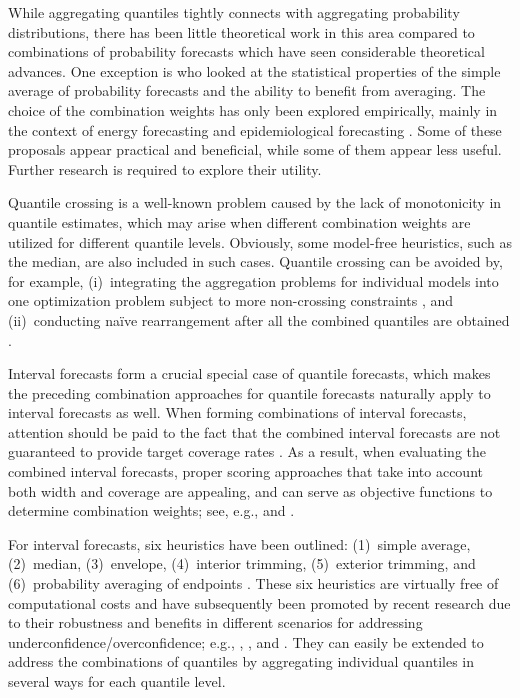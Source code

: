\documentclass[11pt]{article}
\begin{document}
While aggregating quantiles tightly connects with aggregating probability distributions, there has been little theoretical work in this area compared to combinations of probability forecasts which have seen considerable theoretical advances. One exception is \citet{Lichtendahl2013-rt} who looked at the statistical properties of the simple average of probability forecasts and the ability to benefit from averaging. The choice of the combination weights has only been explored empirically, mainly in the context of energy forecasting \citep[e.g.,][]{Wang2019-lx,Browell2020-pa} and epidemiological forecasting \citep[e.g.,][]{Brooks2020-sg,Ray2020-qg}. Some of these proposals appear practical and beneficial, while some of them appear less useful. Further research is required to explore their utility.

Quantile crossing is a well-known problem caused by the lack of monotonicity in quantile estimates, which may arise when different combination weights are utilized for different quantile levels. Obviously, some model-free heuristics, such as the median, are also included in such cases. Quantile crossing can be avoided by, for example, (i)~integrating the aggregation problems for individual models into one optimization problem subject to more non-crossing constraints \citep[e.g.,][]{Kim2021-wa}, and (ii)~conducting na\"{i}ve rearrangement after all the combined quantiles are obtained \citep[e.g.,][]{Chernozhukov2010-zz}.

Interval forecasts form a crucial special case of quantile forecasts, which makes the preceding combination approaches for quantile forecasts naturally apply to interval forecasts as well. When forming combinations of interval forecasts, attention should be paid to the fact that the combined interval forecasts are not guaranteed to provide target coverage rates \citep{Wallis2005-yf,Timmermann2006-en,Grushka-Cockayne2020-qv}. As a result, when evaluating the combined interval forecasts, proper scoring approaches that take into account both width and coverage are appealing, and can serve as objective functions to determine combination weights; see, e.g., \citet{Gneiting2007-ij} and \citet{Jose2009-lh}.

For interval forecasts, six heuristics have been outlined: (1)~simple average, (2)~median, (3)~envelope, (4)~interior trimming, (5)~exterior trimming, and (6)~probability averaging of endpoints \citep{Park2015-zn,Gaba2017-om}. These six heuristics are virtually free of computational costs and have subsequently been promoted by recent research due to their robustness and benefits in different scenarios for addressing underconfidence/overconfidence; e.g., \citet{Smyl2019-av}, \citet{Petropoulos2020-fp}, and \citet{Grushka-Cockayne2020-qv}. They can easily be extended to address the combinations of quantiles by aggregating individual quantiles in several ways for each quantile level.
\end{document}
